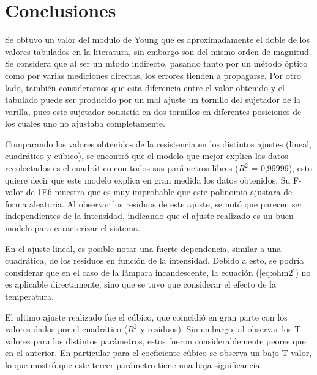 \documentclass[twoside,twocolumn,a4paper]{article}
\begin{document}
\section{Conclusiones}
Se obtuvo un valor del modulo de Young que es aproximadamente el doble de los valores tabulados en la literatura, sin embargo son del mismo orden de magnitud. Se considera que al ser un m\'todo indirecto, pasando tanto por un m\'etodo \'optico como por varias mediciones directas, los errores tienden a propagarse. Por otro lado, tambi\'en consideramos que esta diferencia entre el valor obtenido y el tabulado puede ser producido por un mal ajuste un tornillo del sujetador de la varilla, pues este sujetador consist\'ia en dos tornillos en diferentes posiciones de los cuales uno no ajustaba completamente. 










Comparando los valores obtenidos de la resistencia en los distintos ajustes (lineal, cuadr\'atico y c\'ubico), se encontr\'o que el modelo que mejor explica los datos recolectados es el cuadr\'atico con todos sus par\'ametros libres ($R^2$ = 0,99999), esto quiere decir que este modelo explica en gran medida los datos obtenidos. Su F-valor de 1E6 muestra que es muy improbable que este polinomio ajustara de forma aleatoria. Al observar los residuos de este ajuste, se not\'o que parecen ser independientes de la intensidad, indicando que el ajuste realizado es un buen modelo para caracterizar el sistema.
\par

En el ajuste lineal, es posible notar una fuerte dependencia, similar a una cuadr\'atica, de los residuos en funci\'on de la intensidad. Debido a esto, se podr\'ia considerar que en el caso de la l\'ampara incandescente, la ecuaci\'on (\ref{eq:ohm2}) no es aplicable directamente, sino que se tuvo que considerar el efecto de la temperatura.

El ultimo ajuste realizado fue el c\'ubico, que coincidi\'o en gran parte con los valores dados por el cuadr\'atico ($R^2$ y residuos). Sin embargo, al observar los T-valores para los distintos par\'ametros, estos fueron considerablemente peores que en el anterior. En particular para el coeficiente c\'ubico se observa un bajo T-valor, lo que mostr\'o que este tercer par\'ametro tiene una baja significancia.

\end{document}
